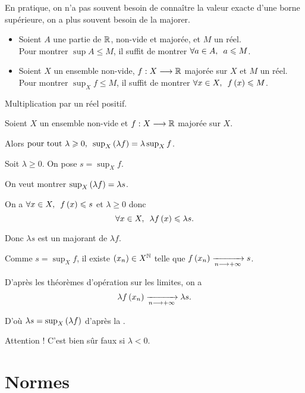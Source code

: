 En pratique, on n'a pas souvent besoin de connaître la valeur exacte d'une borne supérieure, on a plus souvent besoin de la majorer.

\begin{prop}
\begin{itemize}
    \item Soient \(A\) une partie de \(\mathbb{R}\), non-vide et majorée, et \(M\) un réel. \\ Pour montrer \(\sup A\leq M\), il suffit de montrer \(\quantifs{\forall a\in A}a\leq M\). \\
    \item Soient \(X\) un ensemble non-vide, \(f:X\longrightarrow\mathbb{R}\) majorée sur \(X\) et \(M\) un réel. \\ Pour montrer \(\sup_Xf\leq M\), il suffit de montrer \(\quantifs{\forall x\in X}f\paren{x}\leq M\).
\end{itemize}
\end{prop}

Multiplication par un réel positif.

\begin{prop}
Soient \(X\) un ensemble non-vide et \(f:X\longrightarrow\mathbb{R}\) majorée sur \(X\).

Alors \(\quantifs{\tpt\lambda\geq0}\sup_X\paren{\lambda f}=\lambda\sup_Xf\).
\end{prop}

\begin{dem}
Soit \(\lambda\geq0\). On pose \(s=\sup_Xf\).

On veut montrer \(\sup_X\left(\lambda f\right)=\lambda s\).

On a \(\quantifs{\forall x\in X}f\paren{x}\leq s\) et \(\lambda\geq0\) donc \[\quantifs{\forall x\in X}\lambda f\paren{x}\leq\lambda s.\]

Donc \(\lambda s\) est un majorant de \(\lambda f\).

Comme \(s=\sup_Xf\), il existe \(\left(x_n\right)\in X^{\mathbb{N}}\) telle que \(f\left(x_n\right)\xrightarrow[n\longrightarrow+\infty]{}s\).

D'après les théorèmes d'opération sur les limites, on a \[\lambda f\left(x_n\right)\xrightarrow[n\longrightarrow+\infty]{}\lambda s.\]

D'où \(\lambda s=\sup_X\left(\lambda f\right)\) d'après la .
\end{dem}

Attention ! C'est bien sûr faux si \(\lambda<0\).

\section{Normes}

